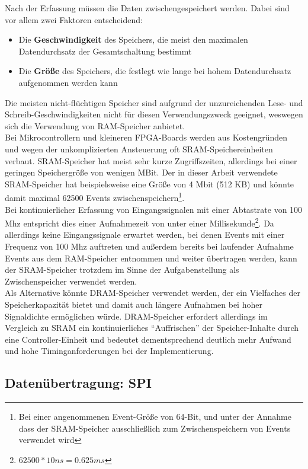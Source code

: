 Nach der Erfassung müssen die Daten zwischengespeichert werden. Dabei sind vor allem zwei Faktoren entscheidend:
\begin{itemize} 
	\item Die \textbf{Geschwindigkeit} des Speichers, die meist den maximalen Datendurchsatz der Gesamtschaltung bestimmt
	\item Die \textbf{Größe} des Speichers, die festlegt wie lange bei hohem Datendurchsatz aufgenommen werden kann 
\end{itemize}
Die meisten nicht-flüchtigen Speicher sind aufgrund der unzureichenden Lese- und Schreib-Geschwindigkeiten nicht für diesen Verwendungszweck geeignet, weswegen sich die Verwendung von \acrshort{RAM}-Speicher anbietet. \\
Bei Mikrocontrollern und kleineren FPGA-Boards werden aus Kostengründen und wegen der unkomplizierten Ansteuerung oft SRAM-Speichereinheiten verbaut. SRAM-Speicher hat meist sehr kurze Zugriffszeiten, allerdings bei einer geringen Speichergröße von wenigen MBit. Der in dieser Arbeit verwendete SRAM-Speicher hat beispielsweise eine Größe von 4 Mbit (512 KB) und könnte damit maximal 62500 Events zwischenspeichern\footnote{Bei einer angenommenen Event-Größe von 64-Bit, und unter der Annahme dass der SRAM-Speicher ausschließlich zum Zwischenspeichern von Events verwendet wird}.\\
Bei kontinuierlicher Erfassung von Eingangssignalen mit einer Abtastrate von 100 Mhz entspricht dies einer Aufnahmezeit von unter einer Millisekunde\footnote{$62500 * 10 ns = 0.625 ms$}. Da allerdings keine Eingangssignale erwartet werden, bei denen Events mit einer Frequenz von 100 Mhz auftreten und außerdem bereits bei laufender Aufnahme Events aus dem RAM-Speicher entnommen und weiter übertragen werden, kann der SRAM-Speicher trotzdem im Sinne der Aufgabenstellung als Zwischenspeicher verwendet werden.\\
Als Alternative könnte DRAM-Speicher verwendet werden, der ein Vielfaches der Speicherkapazität bietet und damit auch längere Aufnahmen bei hoher Signaldichte ermöglichen würde. DRAM-Speicher erfordert allerdings im Vergleich zu SRAM ein kontinuierliches ``Auffrischen'' der Speicher-Inhalte durch eine Controller-Einheit und bedeutet dementsprechend deutlich mehr Aufwand und hohe Timinganforderungen bei der Implementierung.


\subsection{Datenübertragung: SPI}

